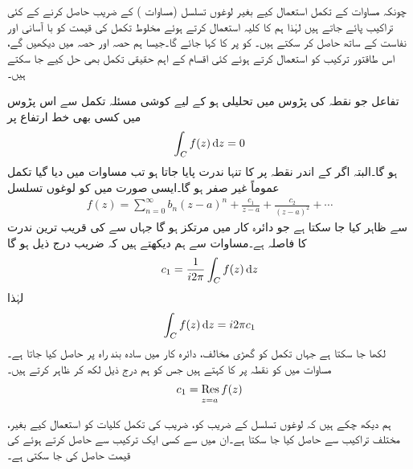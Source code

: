 چونکہ مساوات  کے تکمل استعمال کیے بغیر لوغوں تسلسل (مساوات ) کے  ضریب  حاصل کرنے کے کئی تراکیب پائے جاتے ہیں لہٰذا ہم  کا کلیہ استعمال کرتے ہوئے مخلوط تکمل کی قیمت کو با آسانی اور  نفاست کے ساتھ حاصل کر سکتے ہیں۔  کو  پر  کا  کہا جائے گا۔جیسا ہم حصہ  اور حصہ  میں دیکھیں گے، اس طاقتور ترکیب کو استعمال کرتے ہوئے کئی اقسام کے اہم حقیقی تکمل بھی حل کیے جا سکتے ہیں۔

تفاعل  جو نقطہ  کی پڑوس میں تحلیلی ہو کے لیے کوشی مسئلہ تکمل سے اس پڑوس میں کسی بھی خط ارتفاع  پر 
\begin{align}\label{مساوات_بقیہ_تکمل_الف}
\int_C f(z)\dif z=0
\end{align}
ہو گا۔البتہ اگر  کے اندر نقطہ   پر  کا تنہا ندرت پایا جاتا ہو تب  مساوات  میں دیا گیا تکمل عموماً غیر صفر ہو گا۔ایسی صورت میں  کو لوغوں تسلسل
\begin{align}\label{مساوات_بقیہ_تکمل_ب}
f(z)=\sum\limits_{n=0}^{\infty} b_n(z-a)^n+\frac{c_1}{z-a}+\frac{c_2}{(z-a)^2}+\cdots
\end{align}
سے ظاہر کیا جا سکتا ہے جو دائرہ کار  میں مرتکز ہو گا جہاں  سے  کی قریب ترین ندرت کا فاصلہ  ہے۔مساوات  سے ہم دیکھتے ہیں کہ  ضریب   درج ذیل ہو گا
\begin{align*}
c_1=\frac{1}{i2\pi}\int_C f(z)\dif z
\end{align*}
لہٰذا
\begin{align}\label{مساوات_بقیہ_تکمل_پ}
\int_C f(z)\dif z=i2\pi c_1
\end{align}
لکھا جا سکتا ہے جہاں تکمل کو گھڑی مخالف، دائرہ کار  میں سادہ بند راہ   پر حاصل کیا جاتا ہے۔مساوات  میں  کو نقطہ  پر  کا  کہتے ہیں جس کو ہم درج ذیل لکھ کر ظاہر کرتے ہیں۔
\begin{align}
c_1=\underset{z=a\hfill}{\Res f(z)}
\end{align}

ہم دیکھ چکے ہیں کہ لوغوں تسلسل کے  ضریب  کو،  ضریب  کی تکمل کلیات کو استعمال کیے بغیر، مختلف تراکیب سے حاصل کیا جا سکتا ہے۔ان میں سے  کسی ایک ترکیب سے  حاصل کرتے ہوئے  کی قیمت حاصل کی جا سکتی ہے۔  

